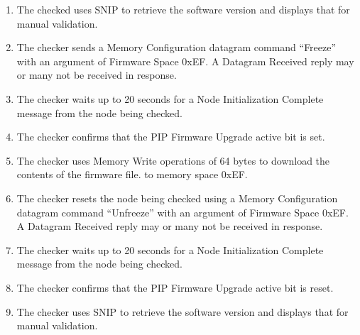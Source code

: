 \begin{enumerate}
\item The checked uses SNIP to retrieve the software version and displays that for manual 
    validation.
\item The checker sends a Memory Configuration datagram command “Freeze” with an 
    argument of Firmware Space 0xEF. 
    A Datagram Received reply may or many not be received in response.
\item The checker waits up to 20 seconds for a Node Initialization Complete message from the 
    node being checked.
\item The checker confirms that the PIP Firmware Upgrade active bit is set.
\item The checker uses Memory Write operations of 64 bytes to download the contents of the firmware file.
    to memory space 0xEF.
\item The checker resets the node being checked using a Memory Configuration 
    datagram command “Unfreeze” with an argument of Firmware Space 0xEF.    
    A Datagram Received reply may or many not be received in response.
\item The checker waits up to 20 seconds for a Node Initialization Complete message from the 
    node being checked.
\item The checker confirms that the PIP Firmware Upgrade active bit is reset.
\item The checker uses SNIP to retrieve the software version and displays that for manual 
    validation.
\end{enumerate}

  
